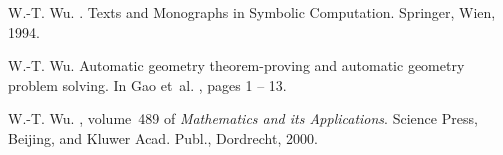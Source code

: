 \documentclass[11pt]{article}
\begin{document}
\begin{thebibliography}{10}
W.-T. Wu.
.
\newblock Texts and Monographs in Symbolic Computation. Springer, Wien, 1994.

W.-T. Wu.
\newblock Automatic geometry theorem-proving and automatic geometry problem
  solving.
\newblock In Gao et~al. \cite{Proceedings/ADG-98}, pages 1 -- 13.

W.-T. Wu.
, volume~489 of {\em Mathematics and
  its Applications}.
\newblock Science Press, Beijing, and Kluwer Acad. Publ., Dordrecht, 2000.

\end{thebibliography}
\end{document}
